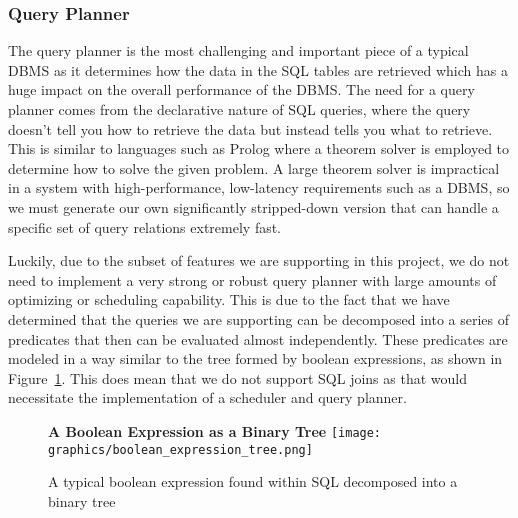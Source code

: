 \documentclass[letterpaper, 11pt]{article}
\begin{document}
\subsubsection{Query Planner}
The query planner is the most challenging and important piece of a typical DBMS as it
determines how the data in the SQL tables are retrieved which has a huge impact on
the overall performance of the DBMS. The need for a query planner comes from the
declarative nature of SQL queries, where the query doesn't tell you how to retrieve the
data but instead tells you what to retrieve. This is similar to languages such as Prolog where
a theorem solver is employed to determine how to solve the given problem. A large theorem
solver is impractical in a system with high-performance, low-latency requirements such as
a DBMS, so we must generate our own significantly stripped-down version that can handle a
specific set of query relations extremely fast.
\par\vspace{\baselineskip}
Luckily, due to the subset of features we are supporting in this project, we do not need to
implement a very strong or robust query planner with large amounts of optimizing or scheduling
capability. This is due to the fact that we have determined that the queries we are supporting
can be decomposed into a series of predicates that then can be evaluated almost independently.
These predicates are modeled in a way similar to the tree formed by boolean expressions, as shown
in Figure~\ref{fig:bool_expr_tree}. This does mean that we do not support SQL joins as that would
necessitate the implementation of a scheduler and query planner.
\par\vspace{\baselineskip}

\begin{figure}[H]
 \centering
 \textbf{A Boolean Expression as a Binary Tree}
 \texttt{[image: graphics/boolean\_expression\_tree.png]}
 \caption{A typical boolean expression found within SQL decomposed into a binary tree}
 \label{fig:bool_expr_tree}
\end{figure}
\end{document}
